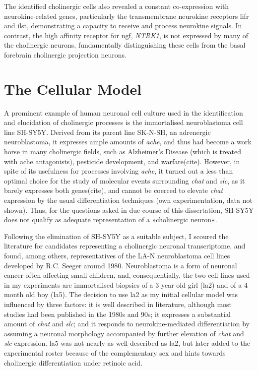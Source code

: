 The identified cholinergic cells also revealed a constant co-expression with neurokine-related genes, particularly the transmembrane neurokine receptors \ac{lifr} and \ac{ilst}, demonstrating a capacity to receive and process neurokine signals. In contrast, the high affinity receptor for \ac{ngf}, \textit{NTRK1}, is not expressed by many of the cholinergic neurons, fundamentally distinguishing these cells from the basal forebrain cholinergic projection neurons.

\section{The Cellular Model}
A prominent example of human neuronal cell culture used in the identification and elucidation of cholinergic processes is the immortalised neuroblastoma cell line SH-SY5Y\cite{Biedler1978}. Derived from its parent line SK-N-SH, an adrenergic neuroblastoma\cite{Biedler1973}, it expresses ample amounts of \textit{\ac{ache}}, and thus had become a work horse in many cholinergic fields, such as Alzheimer's Disease (which is treated with \ac{ache} antagonists), pesticide development, and warfare(cite). However, in spite of its usefulness for processes involving \textit{\ac{ache}}, it turned out a less than optimal choice for the study of molecular events surrounding \textit{\ac{chat}} and \textit{\ac{slc}}, as it barely expresses both genes(cite), and cannot be coerced to elevate \textit{\ac{chat}} expression by the usual differentiation techniques (own experimentation, data not shown). Thus, for the questions asked in due course of this dissertation, SH-SY5Y does not qualify as adequate representation of a »cholinergic neuron«.

Following the elimination of SH-SY5Y as a suitable subject, I scoured the literature for candidates representing a cholinergic neuronal transcriptome, and found, among others, representatives of the LA-N neuroblastoma cell lines developed by R.C. Seeger around 1980\cite{Seeger1977, Seeger1982}. Neuroblastoma is a form of neuronal cancer often affecting small children, and, consequentially, the two cell lines used in my experiments are immortalised biopsies of a 3 year old girl (\acs{la2}\cite{Seeger1977}) and of a 4 month old boy (\mbox{\acs{la5}}\cite{Seeger1982}). The decision to use \ac{la2} as my initial cellular model was influenced by three factors: it is well described in literature, although most studies had been published in the 1980s and 90s; it expresses a substantial amount of \textit{\ac{chat}} and \textit{\ac{slc}}; and it responds to neurokine-mediated differentiation by assuming a neuronal morphology accompanied by further elevation of \textit{\ac{chat}} and \textit{\ac{slc}} expression. \ac{la5} was not nearly as well described as \ac{la2}, but later added to the experimental roster because of the complementary sex and hints towards cholinergic differentiation under retinoic acid\cite{Hill1997}.

